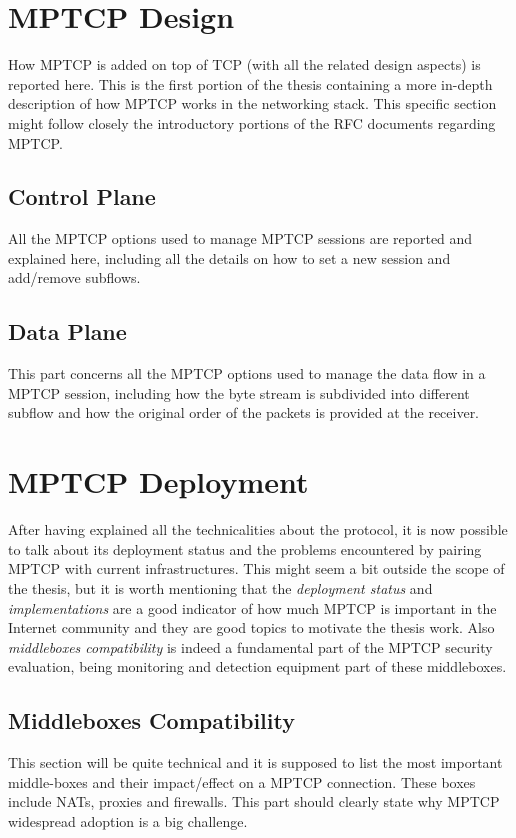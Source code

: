 \section{MPTCP Design}
How MPTCP is added on top of TCP (with all the related design aspects) is reported here. This is the first portion of the thesis containing a more in-depth description of how MPTCP works in the networking stack. This specific section might follow closely the introductory portions of the RFC documents regarding MPTCP.

\subsection{Control Plane}
All the MPTCP options used to manage MPTCP sessions are reported and explained here, including all the details on how to set a new session and add/remove subflows.

\subsection{Data Plane}
This part concerns all the MPTCP options used to manage the data flow in a MPTCP session, including how the byte stream is subdivided into different subflow and how the original order of the packets is provided at the receiver.

\section{MPTCP Deployment}
After having explained all the technicalities about the protocol, it is now possible to talk about its deployment status and the problems encountered by pairing MPTCP with current infrastructures. This might seem a bit outside the scope of the thesis, but it is worth mentioning that the \textit{deployment status} and \textit{implementations} are a good indicator of how much MPTCP is important in the Internet community and they are good topics to motivate the thesis work. Also \textit{middleboxes compatibility} is indeed a fundamental part of the MPTCP security evaluation, being monitoring and detection equipment part of these middleboxes.

\subsection{Middleboxes Compatibility}
This section will be quite technical and it is supposed to list the most important middle-boxes and their impact/effect on a MPTCP connection. These boxes include NATs, proxies and firewalls. This part should clearly state why MPTCP widespread adoption is a big challenge.


